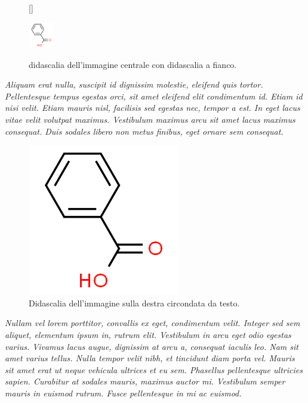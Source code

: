 \begin{figure}[!h]
[\FBwidth]
{\caption{didascalia dell'immagine centrale con didascalia a fianco.}}
{\includegraphics[width=0.1\textwidth]{img/acbenz.png}}
{\label{fig:2}}
\end{figure}

\textit{Aliquam erat nulla, suscipit id dignissim molestie, eleifend quis tortor. Pellentesque tempus egestas orci, sit amet eleifend elit condimentum id. Etiam id nisi velit. Etiam mauris nisl, facilisis sed egestas nec, tempor a est. In eget lacus vitae velit volutpat maximus. Vestibulum maximus arcu sit amet lacus maximus consequat. Duis sodales libero non metus finibus, eget ornare sem consequat.}

\begin{figure} %
    \centering
    \includegraphics[scale=0.5]{img/acbenz.png}
    \caption{Didascalia dell'immagine sulla destra circondata da testo.} 
    \label{fig:3}
\end{figure}

\textit{Nullam vel lorem porttitor, convallis ex eget, condimentum velit. Integer sed sem aliquet, elementum ipsum in, rutrum elit. Vestibulum in arcu eget odio egestas varius. Vivamus lacus augue, dignissim at arcu a, consequat iaculis leo. Nam sit amet varius tellus. Nulla tempor velit nibh, et tincidunt diam porta vel. Mauris sit amet erat ut neque vehicula ultrices et eu sem. Phasellus pellentesque ultricies sapien. Curabitur at sodales mauris, maximus auctor mi. Vestibulum semper mauris in euismod rutrum. Fusce pellentesque in mi ac euismod.}

